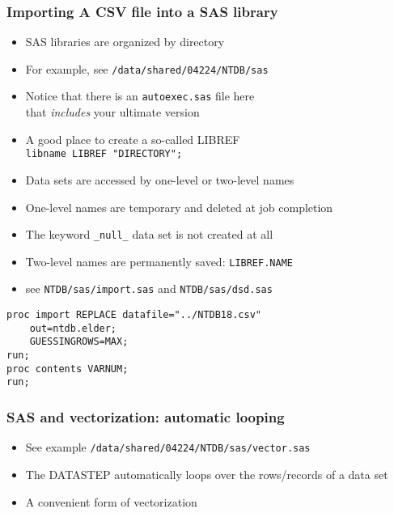 \documentclass[11pt,pdftex,dvipsnames,usenames,helvetica]{beamer}
\begin{document}
\begin{frame}[fragile]
\frametitle{Importing A CSV file into a SAS library}
\begin{itemize}
\item SAS libraries are organized by directory
\item For example, see {\tt /data/shared/04224/NTDB/sas}
\item Notice that there is an {\tt autoexec.sas} file here\\
that {\it includes} your ultimate version
\item A good place to create a so-called LIBREF\\ 
{\tt libname LIBREF "DIRECTORY";}
\item Data sets are accessed by one-level or two-level names
\item One-level names are temporary and deleted at job completion
\item The keyword {\tt \_null\_} data set is not created at all
\item Two-level names are permanently saved: {\tt LIBREF.NAME}
\item see {\tt NTDB/sas/import.sas} and {\tt NTDB/sas/dsd.sas}
\end{itemize}
\begin{verbatim}
proc import REPLACE datafile="../NTDB18.csv" 
    out=ntdb.elder;
    GUESSINGROWS=MAX;
run;
proc contents VARNUM;
run;
\end{verbatim}
\end{frame}

\begin{frame}[fragile]
\frametitle{SAS and vectorization: automatic looping}
\begin{itemize}
\item See example {\tt /data/shared/04224/NTDB/sas/vector.sas}
\item The DATASTEP automatically loops over the rows/records
of a data set
\item A convenient form of vectorization 
\end{itemize}
\end{frame}
\end{document}

